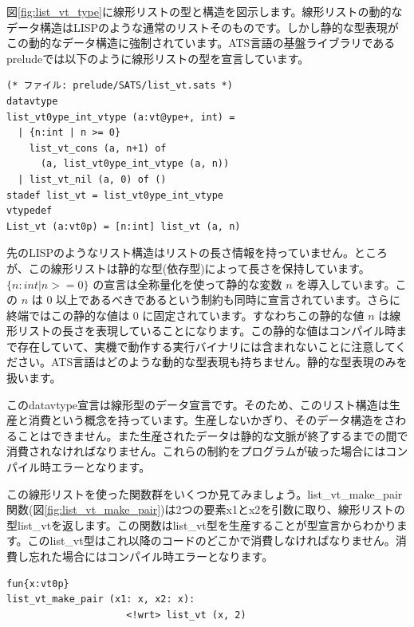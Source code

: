 \documentclass{ipsjprosym}
\begin{document}
図\ref{fig:list_vt_type}に線形リストの型と構造を図示します。線形リストの動的なデータ構造はLISPのような通常のリストそのものです。しかし静的な型表現がこの動的なデータ構造に強制されています。ATS言語の基盤ライブラリであるpreludeでは以下のように線形リストの型を宣言しています。

\vspace{3mm}
\begin{verbatim}
(* ファイル: prelude/SATS/list_vt.sats *)
datavtype
list_vt0ype_int_vtype (a:vt@ype+, int) =
  | {n:int | n >= 0}
    list_vt_cons (a, n+1) of
      (a, list_vt0ype_int_vtype (a, n))
  | list_vt_nil (a, 0) of ()
stadef list_vt = list_vt0ype_int_vtype
vtypedef
List_vt (a:vt0p) = [n:int] list_vt (a, n)
\end{verbatim}
\vspace{3mm}

先のLISPのようなリスト構造はリストの長さ情報を持っていません。ところが、この線形リストは静的な型(依存型)によって長さを保持しています。$\{n:int | n >= 0\}$ の宣言は全称量化を使って静的な変数 $n$ を導入しています。この $n$ は $0$ 以上であるべきであるという制約も同時に宣言されています。さらに終端ではこの静的な値は $0$ に固定されています。すなわちこの静的な値 $n$ は線形リストの長さを表現していることになります。この静的な値はコンパイル時まで存在していて、実機で動作する実行バイナリには含まれないことに注意してください。ATS言語はどのような動的な型表現も持ちません。静的な型表現のみを扱います。

このdatavtype宣言は線形型のデータ宣言です。そのため、このリスト構造は生産と消費という概念を持っています。生産しないかぎり、そのデータ構造をさわることはできません。また生産されたデータは静的な文脈が終了するまでの間で消費されなければなりません。これらの制約をプログラムが破った場合にはコンパイル時エラーとなります。

この線形リストを使った関数群をいくつか見てみましょう。list\_vt\_make\_pair関数(図\ref{fig:list_vt_make_pair})は2つの要素x1とx2を引数に取り、線形リストの型list\_vtを返します。この関数はlist\_vt型を生産することが型宣言からわかります。このlist\_vt型はこれ以降のコードのどこかで消費しなければなりません。消費し忘れた場合にはコンパイル時エラーとなります。

\vspace{3mm}
\begin{verbatim}
fun{x:vt0p}
list_vt_make_pair (x1: x, x2: x):
                     <!wrt> list_vt (x, 2)
\end{verbatim}
\vspace{3mm}
\end{document}
